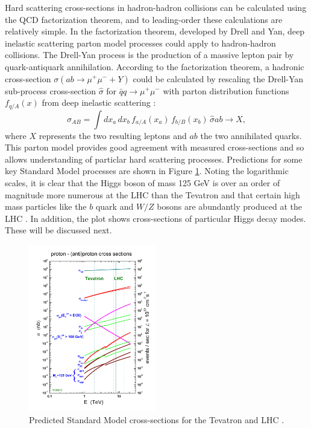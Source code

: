Hard scattering cross-sections in hadron-hadron collisions can be calculated using the QCD factorization theorem, and to leading-order these calculations are relatively simple. In the factorization theorem, developed by Drell and Yan, deep inelastic scattering parton model processes could apply to hadron-hadron collisions. The Drell-Yan process is the production of a massive lepton pair by quark-antiquark annihilation. According to the factorization theorem, a hadronic cross-section $\sigma(ab\rightarrow \mu^+\mu^-+Y)$ could be calculated by rescaling the Drell-Yan sub-process cross-section $\hat{\sigma}$ for $\bar{q}q\rightarrow\mu^+\mu^-$ with parton distribution functions $f_{q/A}(x)$ from deep inelastic scattering \cite{Campbell}:
\begin{equation}
\sigma_{AB} = \int dx_a \, dx_b \, f_{a/A}(x_a) \, f_{b/B}(x_b) \,\hat{\sigma}{ab\rightarrow X},
\end{equation}
where $X$ represents the two resulting leptons and $ab$ the two annihilated quarks. This parton model provides good agreement with measured cross-sections and so allows understanding of particlar hard scattering processes. Predictions for some key Standard Model processes are shown in Figure \ref{fig:crosssection}. Noting the logarithmic scales, it is clear that the Higgs boson of mass 125 GeV is over an order of magnitude more numerous at the LHC than the Tevatron and that certain high mass particles like the $b$ quark and $W/Z$ bosons are abundantly produced at the LHC \cite{Campbell}. In addition, the plot shows cross-sections of particular Higgs decay modes. These will be discussed next.
 
\begin{figure}[H]
        \centering
    \includegraphics[width=0.5\textwidth] {Pictures/crosssections.jpg}\hspace{1cm}
    \caption{Predicted Standard Model cross-sections for the Tevatron and LHC \cite{Stirling}.}
    \label{fig:crosssection}
\end{figure}

